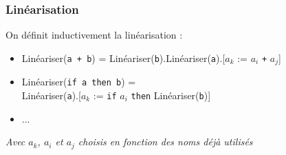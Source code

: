 \begin{frame}[t]
    \frametitle{Linéarisation}

    On définit inductivement la linéarisation :

    \begin{itemize}
        \pause
        \item Linéariser(\texttt{a + b}) = Linéariser(\texttt{b}).Linéariser(\texttt{a}).[$a_k$ := $a_i$ \texttt{+} $a_j$] \\
              \pause
        \item Linéariser(\texttt{if a then b}) = \\
              \hspace{0.5cm} Linéariser(\texttt{a}).[$a_k$ := \texttt{if} $a_i$ \texttt{then} Linéariser(\texttt{b})]
              \pause
        \item ...
    \end{itemize}
    \small \textit{Avec $a_k$, $a_i$ et $a_j$ choisis en fonction des noms déjà utilisés}
\end{frame}

